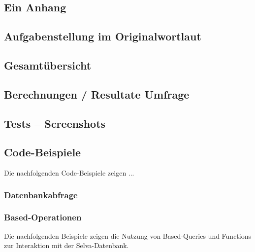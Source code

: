 \begin{appendix} %
\section{Ein Anhang}

\subsection{Aufgabenstellung im Originalwortlaut}

\subsection{Gesamtübersicht}

\subsection{Berechnungen / Resultate Umfrage}

\subsection{Tests – Screenshots}

\subsection{Code-Beispiele} 
Die nachfolgenden Code-Beispiele zeigen ... 

\subsubsection{Datenbankabfrage} 
\label{sec:selva-operationen}





\subsubsection{Based-Operationen}
\label{sec:based-operationen}
Die nachfolgenden Beispiele zeigen die Nutzung von Based-Queries und Functions zur Interaktion mit der Selva-Datenbank.


\end{appendix}
